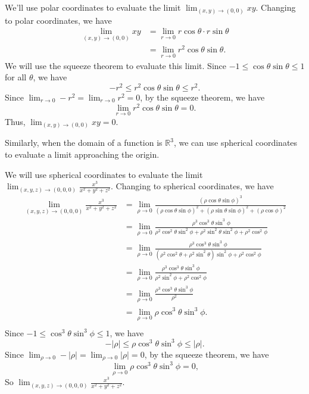 \documentclass{ximera}
\begin{document}
\begin{example}
We'll use polar coordinates to evaluate the limit $\lim_{(x,y)\rightarrow (0,0)}xy$. Changing to polar coordinates, we have
\begin{align*}
\lim_{(x,y)\rightarrow (0,0)}xy &= \lim_{r\rightarrow 0} r\cos\theta \cdot r\sin\theta\\
&= \lim_{r\rightarrow 0} r^2\cos\theta\sin\theta.
\end{align*}
We will use the squeeze theorem to evaluate this limit. Since $-1\leq\cos\theta\sin\theta\leq 1$ for all $\theta$, we have
\[
-r^2\leq r^2\cos\theta\sin\theta\leq r^2.
\]
Since $\lim_{r\rightarrow 0} -r^2 = \lim_{r\rightarrow 0} r^2=0$, by the squeeze theorem, we have
\[
\lim_{r\rightarrow 0} r^2\cos\theta\sin\theta = 0.
\]
Thus, $\lim_{(x,y)\rightarrow (0,0)}xy = 0$.
\end{example}

Similarly, when the domain of a function is $\mathbb{R}^3$, we can use spherical coordinates to evaluate a limit approaching the origin.

\begin{example}
We will use spherical coordinates to evaluate the limit $\lim_{(x,y,z)\rightarrow (0,0,0)}\frac{x^3}{x^2+y^2+z^2}$. Changing to spherical coordinates, we have
\begin{align*}
\lim_{(x,y,z)\rightarrow (0,0,0)}\frac{x^3}{x^2+y^2+z^2} &= \lim_{\rho\rightarrow 0}\frac{(\rho\cos\theta\sin\phi)^3}{(\rho\cos\theta\sin\phi)^2+(\rho\sin\theta\sin\phi)^2+(\rho\cos\phi)^2}\\
&= \lim_{\rho\rightarrow 0}\frac{\rho^3\cos^3\theta\sin^3\phi}{\rho^2\cos^2\theta\sin^2\phi+\rho^2\sin^2\theta\sin^2\phi+\rho^2\cos^2\phi}\\
&= \lim_{\rho\rightarrow 0}\frac{\rho^3\cos^3\theta\sin^3\phi}{(\rho^2\cos^2\theta+\rho^2\sin^2\theta)\sin^2\phi+\rho^2\cos^2\phi}\\
&= \lim_{\rho\rightarrow 0}\frac{\rho^3\cos^3\theta\sin^3\phi}{\rho^2\sin^2\phi+\rho^2\cos^2\phi}\\
&= \lim_{\rho\rightarrow 0}\frac{\rho^3\cos^3\theta\sin^3\phi}{\rho^2}\\
&= \lim_{\rho\rightarrow 0}\rho\cos^3\theta\sin^3\phi.\\
\end{align*}
Since $-1\leq \cos^3\theta\sin^3\phi\leq 1$, we have
\[
-|\rho|\leq \rho\cos^3\theta\sin^3\phi\leq |\rho|.
\]
Since $\lim_{\rho\rightarrow 0}-|\rho| = \lim_{\rho\rightarrow 0}|\rho|=0$, by the squeeze theorem, we have
\[
\lim_{\rho\rightarrow 0}\rho\cos^3\theta\sin^3\phi = 0,
\]
So $\lim_{(x,y,z)\rightarrow (0,0,0)}\frac{x^3}{x^2+y^2+z^2}$.
\end{example}
\end{document}
